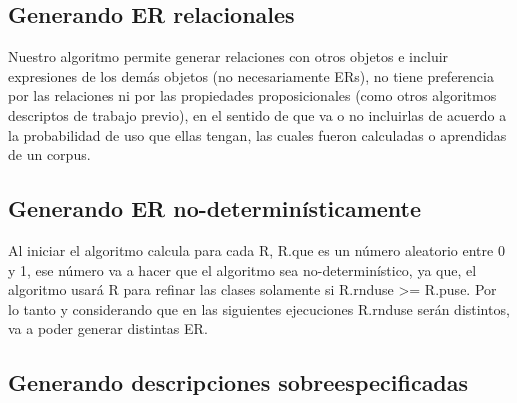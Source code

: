\subsection{Generando ER relacionales}

Nuestro algoritmo permite generar relaciones con otros objetos e incluir expresiones de los dem\'as objetos (no necesariamente ERs), no tiene preferencia por las relaciones ni por las propiedades proposicionales (como otros algoritmos descriptos de trabajo previo), en el sentido de que va o no incluirlas de acuerdo a la probabilidad de uso que ellas tengan, las cuales fueron calculadas o aprendidas de un corpus.

\subsection{Generando ER no-determin\'isticamente}

Al iniciar el algoritmo calcula para cada R, R.\randomuse que es un n\'umero aleatorio entre 0 y 1, ese n\'umero va a hacer que el algoritmo sea no-determin\'istico, ya que, el algoritmo usar\'a R para refinar las clases solamente si 
R.rnduse >= R.puse. Por lo tanto y considerando que en las siguientes ejecuciones R.rnduse ser\'an distintos, va a poder generar distintas ER.

\subsection{Generando descripciones sobreespecificadas}\label{sec:overspecification}

